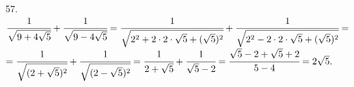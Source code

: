 57.
$\cfrac{1}{\sqrt{9+4\sqrt{5}}}+\cfrac{1}{\sqrt{9-4\sqrt{5}}}=\cfrac{1}{\sqrt{2^2+2\cdot2\cdot\sqrt{5}+(\sqrt{5})^2}}+\cfrac{1}{\sqrt{2^2-2\cdot2\cdot\sqrt{5}+(\sqrt{5})^2}}=$\\
$=\cfrac{1}{\sqrt{(2+\sqrt{5})^2}}+\cfrac{1}{\sqrt{(2-\sqrt{5})^2}}=\cfrac{1}{2+\sqrt{5}}+\cfrac{1}{\sqrt{5}-2}=
\cfrac{\sqrt{5}-2+\sqrt{5}+2}{5-4}=2\sqrt{5}.$\\
